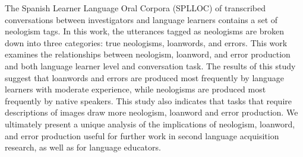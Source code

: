 The Spanish Learner Language Oral Corpora (SPLLOC) of transcribed conversations between investigators and language learners contains a set of neologism tags. In this work, the utterances tagged as neologisms are broken down into three categories: true neologisms, loanwords, and errors. This work examines the relationships between neologism, loanword, and error production and both language learner level and conversation task. The results of this study suggest that loanwords and errors are produced most frequently by language learners with moderate experience, while neologisms are produced most frequently by native speakers. This study also indicates that tasks that require descriptions of images draw more neologism, loanword and error production. We ultimately present a unique analysis of the implications of neologism, loanword, and error production useful for further work in second language acquisition research, as well as for language educators.
